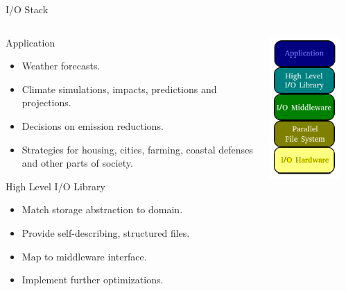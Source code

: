 \documentclass[compress,11pt,xcolor=svgnames,aspectratio=169]{beamer}
\begin{document}
\begin{frame}[fragile]{I/O Stack}

{\tiny

\begin{columns}
\begin{column}{0.38\textwidth}
\begin{block}{Application}
\begin{itemize}
\item Weather forecasts.
\item Climate simulations, impacts, predictions and projections.
\item Decisions on emission reductions.
\item Strategies for housing, cities, farming, coastal defenses and other parts of society.
\end{itemize}
\end{block}
\begin{block}{High Level I/O Library}
\begin{itemize}
\item Match storage abstraction to domain.
\item Provide self-describing, structured files.
\item Map to middleware interface.
\item Implement further optimizations.
\end{itemize}
\end{block}
\end{column}
\begin{column}{0.24\textwidth}
\begin{center}
\includegraphics[scale=0.8]{fig/io-stack}
\end{center}
\end{column}
\begin{column}{0.38\textwidth}

\end{column}
\end{columns}}
\end{frame}
\end{document}
